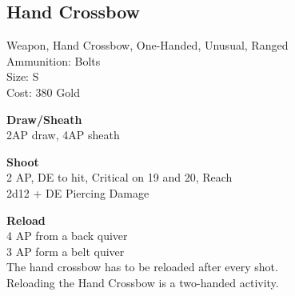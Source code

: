 \subsection{Hand Crossbow}\label{weapon:handCrossbow}
Weapon, Hand Crossbow, One-Handed, Unusual, Ranged\\
Ammunition: Bolts\\
Size: S\\
Cost: 380 Gold

\textbf{Draw/Sheath} \\
2AP draw, 4AP sheath

\textbf{Shoot} \\
2 AP, DE to hit, Critical on 19 and 20,  Reach\\
2d12 + \texttimes DE Piercing Damage

\textbf{Reload} \\
4 AP from a back quiver\\
3 AP form a belt quiver\\
The hand crossbow has to be reloaded after every shot.\\
Reloading the Hand Crossbow is a two-handed activity.
